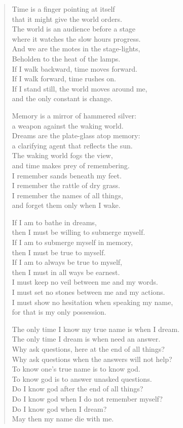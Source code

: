 \begin{verse}
Time is a finger pointing at itself\\
that it might give the world orders.\\
The world is an audience before a stage\\
where it watches the slow hours progress.\\
And we are the motes in the stage-lights,\\
Beholden to the heat of the lamps.\\
If I walk backward, time moves forward.\\
If I walk forward, time rushes on.\\
If I stand still, the world moves around me,\\
and the only constant is change.

Memory is a mirror of hammered silver:\\
a weapon against the waking world.\\
Dreams are the plate-glass atop memory:\\
a clarifying agent that reflects the sun.\\
The waking world fogs the view,\\
and time makes prey of remembering.\\
I remember sands beneath my feet.\\
I remember the rattle of dry grass.\\
I remember the names of all things,\\
and forget them only when I wake.

If I am to bathe in dreams,\\
then I must be willing to submerge myself.\\
If I am to submerge myself in memory,\\
then I must be true to myself.\\
If I am to always be true to myself,\\
then I must in all ways be earnest.\\
I must keep no veil between me and my words.\\
I must set no stones between me and my actions.\\
I must show no hesitation when speaking my name,\\
for that is my only possession.

The only time I know my true name is when I dream.\\
The only time I dream is when need an answer.\\
Why ask questions, here at the end of all things?\\
Why ask questions when the answers will not help?\\
To know one's true name is to know god.\\
To know god is to answer unasked questions.\\
Do I know god after the end of all things?\\
Do I know god when I do not remember myself?\\
Do I know god when I dream?\\
May then my name die with me.


\end{verse}
